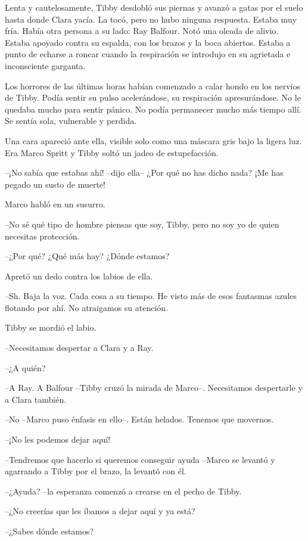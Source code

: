 {Lenta y cautelosamente, Tibby desdobló sus piernas y avanzó a gatas por
 el suelo hasta donde Clara yacía. La tocó, pero no hubo ninguna
 respuesta. Estaba muy fría. Había otra persona a su lado: Ray Balfour.
 Notó una oleada de alivio. Estaba apoyado contra su espalda, con los
 brazos y la boca abiertos. Estaba a punto de echarse a roncar cuando la
respiración se introdujo en su agrietada e inconsciente garganta.}

{Los horrores de las últimas horas habían comenzado a calar hondo en los
 nervios de Tibby. Podía sentir su pulso acelerándose, su respiración
 apresurándose. No le quedaba mucho para sentir pánico. No podía
 permanecer mucho más tiempo allí. Se sentía sola, vulnerable y
perdida.}

{Una cara apareció ante ella, visible solo como una máscara gris bajo la
ligera luz. Era Marco Spritt y Tibby soltó un jadeo de estupefacción.}

{--¡No sabía que estabas ahí! --dijo ella-- ¿Por qué no has dicho nada?
¡Me has pegado un susto de muerte!}

{Marco habló en un susurro.}

{--No sé qué tipo de hombre piensas que soy, Tibby, pero no soy yo de
quien necesitas protección.}

{--¿Por qué? ¿Qué más hay? ¿Dónde estamos?}

{Apretó un dedo contra los labios de ella.}

{--Sh. Baja la voz. Cada cosa a su tiempo. He visto más de esos fantasmas
azules flotando por ahí. No atraigamos su atención.}

{Tibby se mordió el labio.}

{--Necesitamos despertar a Clara y a Ray.}

{--¿A quién?}

{--A Ray. A Balfour --Tibby cruzó la mirada de Marco--. Necesitamos
despertarle y a Clara también.}

{--No --Marco puso énfasis en ello--. Están helados. Tenemos que
movernos.}

{--¡No les podemos dejar aquí!}

{--Tendremos que hacerlo si queremos conseguir ayuda --Marco se levantó y
agarrando a Tibby por el brazo, la levantó con él.}

{--¿Ayuda? --la esperanza comenzó a crearse en el pecho de Tibby.}

{--¿No creerías que les íbamos a dejar aquí y ya está?}

{--¿Sabes dónde estamos?}

